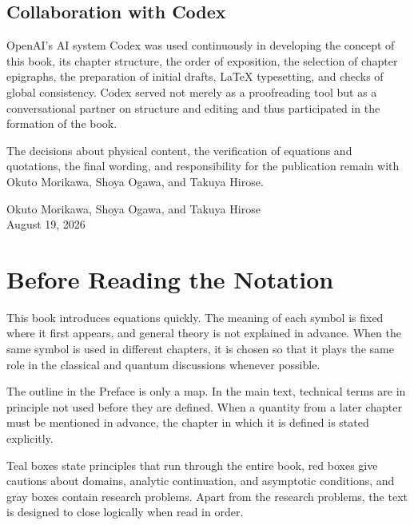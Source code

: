 \section*{Collaboration with Codex}

OpenAI's AI system Codex was used continuously in developing the concept of this book, its chapter structure, the order of exposition, the selection of chapter epigraphs, the preparation of initial drafts, \LaTeX{} typesetting, and checks of global consistency. Codex served not merely as a proofreading tool but as a conversational partner on structure and editing and thus participated in the formation of the book.

The decisions about physical content, the verification of equations and quotations, the final wording, and responsibility for the publication remain with Okuto Morikawa, Shoya Ogawa, and Takuya Hirose.

\vspace{2\baselineskip}
\begin{flushright}
Okuto Morikawa, Shoya Ogawa, and Takuya Hirose\\
August 19, 2026
\end{flushright}

\chapter*{Before Reading the Notation}

This book introduces equations quickly. The meaning of each symbol is fixed where it first appears, and general theory is not explained in advance. When the same symbol is used in different chapters, it is chosen so that it plays the same role in the classical and quantum discussions whenever possible.

The outline in the Preface is only a map. In the main text, technical terms are in principle not used before they are defined. When a quantity from a later chapter must be mentioned in advance, the chapter in which it is defined is stated explicitly.

Teal boxes state principles that run through the entire book, red boxes give cautions about domains, analytic continuation, and asymptotic conditions, and gray boxes contain research problems. Apart from the research problems, the text is designed to close logically when read in order.
